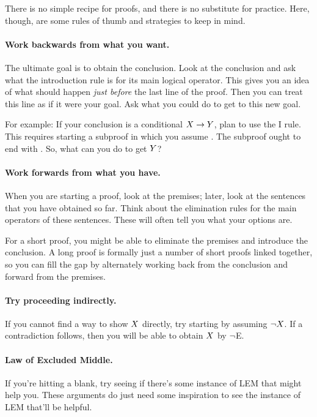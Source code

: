 There is no simple recipe for proofs, and there is no substitute for practice. Here, though, are some rules of thumb and strategies to keep in mind.

\paragraph{Work backwards from what you want.}
The ultimate goal is to obtain the conclusion. Look at the conclusion and ask what the introduction rule is for its main logical operator. This gives you an idea of what should happen \emph{just before} the last line of the proof. Then you can treat this line as if it were your goal. Ask what you could do to get to this new goal.

For example: If your conclusion is a conditional $X\rightarrow Y$, plan to use the {\eif}I rule. This requires starting a subproof in which you assume \metaX. The subproof ought to end with \metaY. So, what can you do to get $Y$?

\paragraph{Work forwards from what you have.}
When you are starting a proof, look at the premises; later, look at the sentences that you have obtained so far. Think about the elimination rules for the main operators of these sentences. These will often tell you what your options are.

For a short proof, you might be able to eliminate the premises and introduce the conclusion. A long proof is formally just a number of short proofs linked together, so you can fill the gap by alternately working back from the conclusion and forward from the premises.

\paragraph{Try proceeding indirectly.}
If you cannot find a way to show $X$ directly, try starting by assuming $\neg X$. If a contradiction follows, then you will be able to obtain $X$ by $\neg$E.

\paragraph{Law of Excluded Middle.}
If you're hitting a blank, try seeing if there's some instance of LEM that might help you. These arguments do just need some inspiration to see the instance of LEM that'll be helpful.

